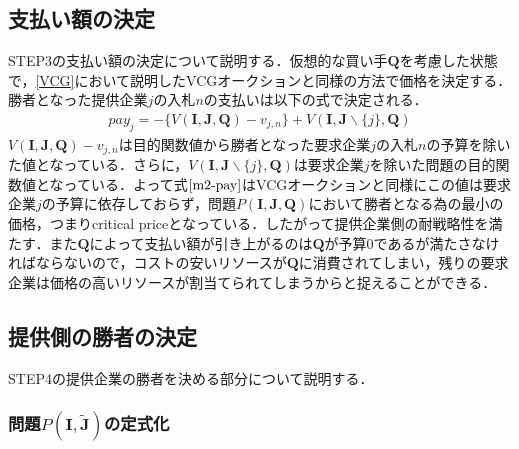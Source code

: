 \hypertarget{ux652fux6255ux3044ux984dux306eux6c7aux5b9a}{%
\subsection{支払い額の決定}\label{ux652fux6255ux3044ux984dux306eux6c7aux5b9a}}

STEP3の支払い額の決定について説明する．仮想的な買い手\(\boldsymbol{Q}\)を考慮した状態で，\ref{VCG}において説明したVCGオークションと同様の方法で価格を決定する．勝者となった提供企業\(j\)の入札\(n\)の支払いは以下の式で決定される．
\begin{align}
pay_j=-\{V(\boldsymbol{I},\boldsymbol{J},\boldsymbol{Q})-v_{j,n}\}+V(\boldsymbol{I},\boldsymbol{J}\backslash\{j\},\boldsymbol{Q}) \label{m2-pay}
\end{align}
\(V(\boldsymbol{I},\boldsymbol{J},\boldsymbol{Q})-v_{j,n}\)は目的関数値から勝者となった要求企業\(j\)の入札\(n\)の予算を除いた値となっている．さらに，\(V(\boldsymbol{I},\boldsymbol{J}\backslash\{j\},\boldsymbol{Q})\)は要求企業\(j\)を除いた問題の目的関数値となっている．よって式\(\eqref{m2-pay}\)はVCGオークションと同様にこの値は要求企業\(j\)の予算に依存しておらず，問題\(P(\boldsymbol{I},\boldsymbol{J},\boldsymbol{Q})\)において勝者となる為の最小の価格，つまりcritical
priceとなっている．したがって提供企業側の耐戦略性を満たす．また\(\boldsymbol{Q}\)によって支払い額が引き上がるのは\(\boldsymbol{Q}\)が予算0であるが満たさなければならないので，コストの安いリソースが\(\boldsymbol{Q}\)に消費されてしまい，残りの要求企業は価格の高いリソースが割当てられてしまうからと捉えることができる．

\hypertarget{ux63d0ux4f9bux5074ux306eux52ddux8005ux306eux6c7aux5b9a}{%
\subsection{提供側の勝者の決定}\label{ux63d0ux4f9bux5074ux306eux52ddux8005ux306eux6c7aux5b9a}}

STEP4の提供企業の勝者を決める部分について説明する．

\hypertarget{ux554fux984cpboldsymboliboldsymboltildejux306eux5b9aux5f0fux5316}{%
\subsubsection{\texorpdfstring{問題\(P(\boldsymbol{I},\boldsymbol{\tilde{J}})\)の定式化}{問題P(\textbackslash boldsymbol\{I\},\textbackslash boldsymbol\{\textbackslash tilde\{J\}\})の定式化}}\label{ux554fux984cpboldsymboliboldsymboltildejux306eux5b9aux5f0fux5316}}

